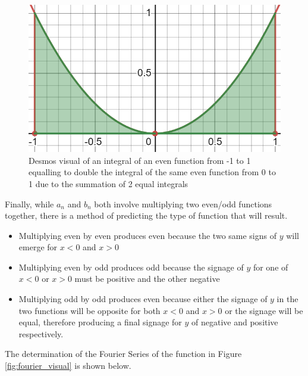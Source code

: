 \documentclass[letterpaper, 12pt]{article}
\begin{document}
\begin{figure}[H]
    \centering
    \includegraphics[width=.6\textwidth]{even.png}
    \caption{Desmos visual of an integral of an even function from -1 to 1 equalling to double the integral of the same even function from 0 to 1 due to the summation of 2 equal integrals \protect\cite{DesmosGraphingCalculator}}
    \label{fig:even}
\end{figure}

Finally, while \(a_n\) and \(b_n\) both involve multiplying
two even/odd functions together, there is a method of
predicting the type of function that will result.

\begin{itemize}
    \item Multiplying even by even produces even because the two same signs of \(y\) will emerge for \(x < 0\) and \(x > 0\)
    \item Multiplying even by odd produces odd because the signage of \(y\) for one of \(x < 0\) or \(x > 0\) must be positive and the other negative
    \item Multiplying odd by odd produces even because either the signage of \(y\) in the two functions will be opposite for both \(x < 0\) and \(x > 0\) or the signage will be equal, therefore producing a final signage for \(y\) of negative and positive respectively.
\end{itemize}

The determination of the Fourier Series of the function in Figure \ref*{fig:fourier_visual}
is shown below.
\end{document}

